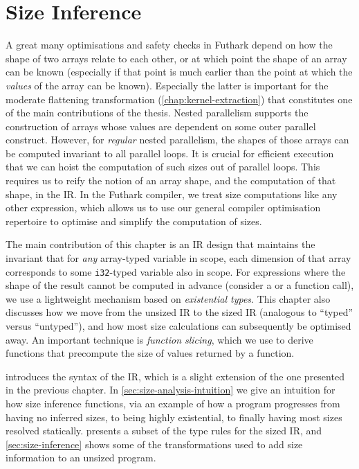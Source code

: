 \newcommand{\subtype}{<:}

\chapter{Size Inference}
\label{chap:size-analysis}

A great many optimisations and safety checks in Futhark depend on how
the shape of two arrays relate to each other, or at which point the
shape of an array can be known (especially if that point is much
earlier than the point at which the \textit{values} of the array can
be known).  Especially the latter is important for the moderate
flattening transformation (\cref{chap:kernel-extraction}) that
constitutes one of the main contributions of the thesis.  Nested
parallelism supports the construction of arrays whose values are
dependent on some outer parallel construct.  However, for
\textit{regular} nested parallelism, the shapes of those arrays can be
computed invariant to all parallel loops.  It is crucial for efficient
execution that we can hoist the computation of such sizes out of
parallel loops.  This requires us to reify the notion of an array
shape, and the computation of that shape, in the IR.  In the Futhark
compiler, we treat size computations like any other expression, which
allows us to use our general compiler optimisation repertoire to
optimise and simplify the computation of sizes.

The main contribution of this chapter is an IR design that maintains
the invariant that for \textit{any} array-typed variable in scope,
each dimension of that array corresponds to some \lstinline{i32}-typed
variable also in scope.  For expressions where the shape of the result
cannot be computed in advance (consider a  or a function
call), we use a lightweight mechanism based on \textit{existential
  types}.  This chapter also discusses how we move from the unsized IR
to the sized IR (analogous to ``typed'' versus ``untyped''), and how
most size calculations can subsequently be optimised away.  An
important technique is \textit{function slicing}, which we use to
derive functions that precompute the size of values returned by a
function.

 introduces the syntax of the IR, which is a slight
extension of the one presented in the previous chapter.  In
\cref{sec:size-analysis-intuition} we give an intuition for how size
inference functions, via an example of how a program progresses from
having no inferred sizes, to being highly existential, to finally
having most sizes resolved statically.  
presents a subset of the type rules for the sized IR, and
\cref{sec:size-inference} shows some of the transformations used to
add size information to an unsized program.

